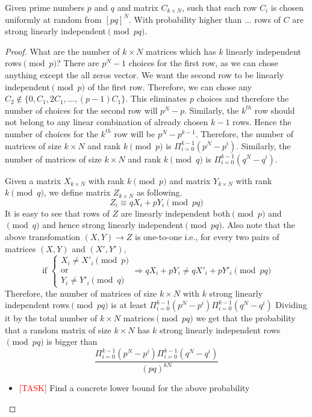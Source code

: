 \documentclass[anon,12pt]{colt2016}
\begin{document}
\begin{lemma}
\label{lem:kIndep}
Given prime numbers $p$ and $q$ and matrix $C_{k\times N}$, such that each row $C_i$ is chosen uniformly at random from $[pq]^{N}$. With probability higher than ... rows of $C$ are strong linearly independent$\pmod{pq}$.
	
\end{lemma}
\begin{proof}
	What are the number of $k\times N$ matrices which has $k$ linearly independent rows$\pmod{p}$? There are $p^{N}-1$ choices for the first row, as we can chose anything except the all zeros vector. We want the second row to be linearly independent$\pmod{p}$ of the first row. Therefore, we can chose any $C_2\notin\{0,C_1,2C_1,\ldots,(p-1)C_1\}$. This eliminates $p$ choices and therefore the number of choices for the second row will $p^{N}-p$. Similarly, the $k^{th}$ row should not belong to any linear combination of already chosen $k-1$ rows. Hence the number of choices for the $k^{th}$ row will be $p^N-p^{k-1}$. Therefore, the number of matrices of size $k\times N$ and rank $k\pmod{p}$ is $\Pi_{i=0}^{k-1}(p^N-p^i)$. Similarly, the number of matrices of size $k\times N$ and rank $k\pmod{q}$ is $\Pi_{i=0}^{k-1}(q^N-q^i)$. 
	
	Given a matrix $X_{k\times N}$ with rank $k\pmod{p}$ and matrix $Y_{k\times N}$ with rank $k\pmod{q}$, we define matrix $Z_{k\times N}$ as following.
	$$
	Z_i \equiv qX_i + pY_i\pmod{pq} 
	$$
It is easy to see that rows of $Z$ are linearly independent both$\pmod{p}$ and$\pmod{q}$ and hence strong linearly independent$\pmod{pq}$. Also note that the above transfomation $(X,Y)\to Z $ is one-to-one i.e., for every two pairs of matrices $(X,Y)$ and $(X',Y')$,  
$$
\text{if }
\left\{ \begin{array}{l}
X_i \neq X'_i\pmod{p}\\
\text{or} \\
Y_i \neq Y'_i\pmod{q}
\end{array}\right.
   \Rightarrow qX_i+pY_i \neq qX'_i+pY'_i\pmod{pq}
$$  
Therefore, the number of matrices of size $k\times N$ with $k$ strong linearly independent rows$\pmod{pq}$ is at least $\Pi_{i=0}^{k-1}(p^N-p^i)\Pi_{i=0}^{k-1}(q^N-q^i)$
Dividing it by the total number of $k\times N$ matrices$\pmod{pq}$ we get that the probability that a random matrix of size $k\times N$ has $k$ strong linearly independent rows$\pmod{pq}$ is bigger than
$$
\frac{\Pi_{i=0}^{k-1}(p^N-p^i)\Pi_{i=0}^{k-1}(q^N-q^i)}{(pq)^{kN}}
$$
\begin{itemize}
	\item {\textcolor{red}{[TASK]} Find a concrete lower bound for the above probability}
\end{itemize}
\end{proof}
\end{document}
